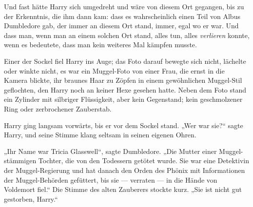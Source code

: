 Und fast hätte Harry sich umgedreht und wäre von diesem Ort gegangen, bis zu der Erkenntnis, die ihm dann kam: dass es wahrscheinlich einen Teil von Albus Dumbledore gab, der immer an diesem Ort stand, immer, egal wo er war. Und dass man, wenn man an einem solchen Ort stand, alles tun, alles \emph{verlieren} konnte, wenn es bedeutete, dass man kein weiteres Mal kämpfen musste.

Einer der Sockel fiel Harry ins Auge; das Foto darauf bewegte sich nicht, lächelte oder winkte nicht, es war ein Muggel-Foto von einer Frau, die ernst in die Kamera blickte, ihr braunes Haar zu Zöpfen in einem gewöhnlichen Muggel-Stil geflochten, den Harry noch an keiner Hexe gesehen hatte. Neben dem Foto stand ein Zylinder mit silbriger Flüssigkeit, aber kein Gegenstand; kein geschmolzener Ring oder zerbrochener Zauberstab.

Harry ging langsam vorwärts, bis er vor dem Sockel stand.
„Wer war sie?“ sagte Harry, und seine Stimme klang seltsam in seinen eigenen Ohren.

„Ihr Name war Tricia Glasswell“, sagte Dumbledore.
„Die Mutter einer Muggel-stämmigen Tochter, die von den Todessern getötet wurde. Sie war eine Detektivin der Muggel-Regierung und hat danach den Orden des Phönix mit Informationen der Muggel-Behörden gefüttert, bis sie — verraten — in die Hände von Voldemort fiel.“ Die Stimme des alten Zauberers stockte kurz.
„Sie ist nicht gut gestorben, Harry.“

